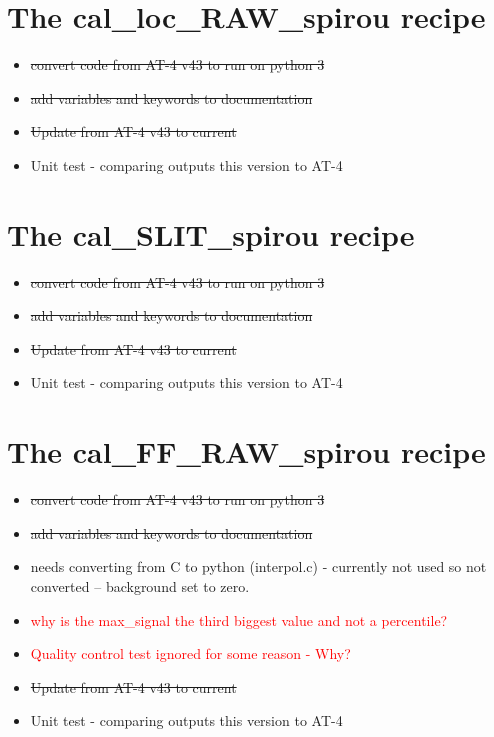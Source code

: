 \section{The cal\_loc\_RAW\_spirou recipe}
\label{ch:todo:cal_loc_RAW_spirou}

\begin{itemize}
	\item \sout{convert code from AT-4 v43 to run on python 3}
	\item \sout{add variables and keywords to documentation}
	\item \sout{Update from AT-4 v43 to current}
	\item Unit test - comparing outputs this version to AT-4
\end{itemize}

\section{The cal\_SLIT\_spirou recipe}
\label{ch:todo:cal_SLIT_spirou}

\begin{itemize}
	\item \sout{convert code from AT-4 v43 to run on python 3}
	\item \sout{add variables and keywords to documentation}
	\item \sout{Update from AT-4 v43 to current}
	\item Unit test - comparing outputs this version to AT-4
\end{itemize}

\section{The cal\_FF\_RAW\_spirou recipe}
\label{ch:todo:cal_FF_RAW_spirou}

\begin{itemize}
	\item \sout{convert code from AT-4 v43 to run on python 3}
	\item \sout{add variables and keywords to documentation}
	\item {} needs converting from C to python (interpol.c) - currently not used so not converted  -- background set to zero.
	\item \textcolor{red}{ why is the max\_signal the third biggest value and not a percentile?}
	\item \textcolor{red}{Quality control test  ignored for some reason - Why?}
	\item \sout{Update from AT-4 v43 to current}
	\item Unit test - comparing outputs this version to AT-4
\end{itemize}

